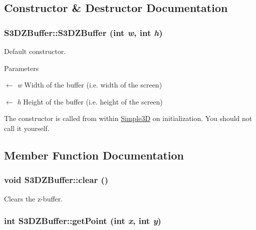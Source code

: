 \subsection{Constructor \& Destructor Documentation}
\hypertarget{class_s3_d_z_buffer_a8983fb4278e5baaa4bdf076f8e28d940}{
\subsubsection[{S3DZBuffer}]{\setlength{\rightskip}{0pt plus 5cm}S3DZBuffer::S3DZBuffer (int {\em w}, \/  int {\em h})}}
\label{class_s3_d_z_buffer_a8983fb4278e5baaa4bdf076f8e28d940}


Default constructor. 


\begin{DoxyParams}{Parameters}
\item[\mbox{$\leftarrow$} {\em w}]Width of the buffer (i.e. width of the screen) \item[\mbox{$\leftarrow$} {\em h}]Height of the buffer (i.e. height of the screen)\end{DoxyParams}
The constructor is called from within \hyperlink{class_simple3_d}{Simple3D} on initialization. You should not call it yourself. 

\subsection{Member Function Documentation}
\hypertarget{class_s3_d_z_buffer_ab2b22d8f910724846765813cc6e8457e}{
\subsubsection[{clear}]{\setlength{\rightskip}{0pt plus 5cm}void S3DZBuffer::clear ()}}
\label{class_s3_d_z_buffer_ab2b22d8f910724846765813cc6e8457e}


Clears the z-\/buffer. 

\hypertarget{class_s3_d_z_buffer_aba5f79850772a0500a629443e413e402}{
\subsubsection[{getPoint}]{\setlength{\rightskip}{0pt plus 5cm}int S3DZBuffer::getPoint (int {\em x}, \/  int {\em y})}}
\label{class_s3_d_z_buffer_aba5f79850772a0500a629443e413e402}



